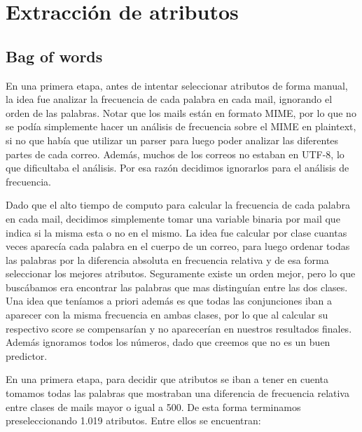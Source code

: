 \documentclass[10pt,a4paper]{article}
\begin{document}
\section{Extracción de atributos}

\subsection{Bag of words}

En una primera etapa, antes de intentar seleccionar atributos de forma manual, la idea fue analizar la frecuencia de cada palabra en cada mail, ignorando el orden de las palabras. Notar que los mails están en formato MIME, por lo que no se podía simplemente hacer un análisis de frecuencia sobre el MIME en plaintext, si no que había que utilizar un parser para luego poder analizar las diferentes partes de cada correo. Además, muchos de los correos no estaban en UTF-8, lo que dificultaba el análisis. Por esa razón decidimos ignorarlos para el análisis de frecuencia.

Dado que el alto tiempo de computo para calcular la frecuencia de cada palabra en cada mail, decidimos simplemente tomar una variable binaria por mail que indica si la misma esta o no en el mismo. La idea fue calcular por clase cuantas veces aparecía cada palabra en el cuerpo de un correo, para luego ordenar todas las palabras por la diferencia absoluta en frecuencia relativa y de esa forma seleccionar los mejores atributos. Seguramente existe un orden mejor, pero lo que buscábamos era encontrar las palabras que mas distinguían entre las dos clases. Una idea que teníamos a priori además es que todas las conjunciones iban a aparecer con la misma frecuencia en ambas clases, por lo que al calcular su respectivo score se compensarían y no aparecerían en nuestros resultados finales. Además ignoramos todos los números, dado que creemos que no es un buen predictor.

En una primera etapa, para decidir que atributos se iban a tener en cuenta tomamos todas las palabras que mostraban una diferencia de frecuencia relativa entre clases de mails mayor o igual a 500. De esta forma terminamos preseleccionando 1.019 atributos. Entre ellos se encuentran:
\end{document}
